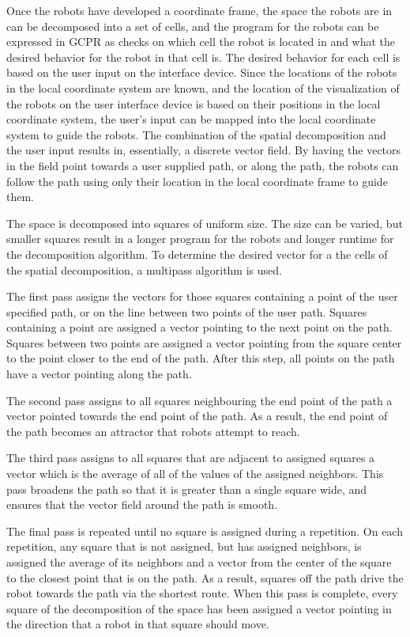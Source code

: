 Once the robots have developed a coordinate frame, the space the robots are in can be decomposed into a set of cells, and the program for the robots can be expressed in GCPR as checks on which cell the robot is located in and what the desired behavior for the robot in that cell is. 
The desired behavior for each cell is based on the user input on the interface device. Since the locations of the robots in the local coordinate system are known, and the location of the visualization of the robots on the user interface device is based on their positions in the local coordinate system, the user's input can be mapped into the local coordinate system to guide the robots. 
The combination of the spatial decomposition and the user input results in, essentially, a discrete vector field. 
By having the vectors in the field point towards a user supplied path, or along the path, the robots can follow the path using only their location in the local coordinate frame to guide them. 

The space is decomposed into squares of uniform size. The size can be varied, but smaller squares result in a longer program for the robots and longer runtime for the decomposition algorithm. 
To determine the desired vector for a the cells of the spatial decomposition, a multipass algorithm is used. 

The first pass assigns the vectors for those squares containing a point of the user specified path, or on the line between two points of the user path. 
Squares containing a point are assigned a vector pointing to the next point on the path. 
Squares between two points are assigned a vector pointing from the square center to the point closer to the end of the path. 
After this step, all points on the path have a vector pointing along the path. 

The second pass assigns to all squares neighbouring the end point of the path a vector pointed towards the end point of the path. 
As a result, the end point of the path becomes an attractor that robots attempt to reach. 

The third pass assigns to all squares that are adjacent to assigned squares a vector which is the average of all of the values of the assigned neighbors. 
This pass broadens the path so that it is greater than a single square wide, and ensures that the vector field around the path is smooth. 

The final pass is repeated until no square is assigned during a repetition. 
On each repetition, any square that is not assigned, but has assigned neighbors, is assigned the average of its neighbors and a vector from the center of the square to the closest point that is on the path. 
As a result, squares off the path drive the robot towards the path via the shortest route. 
When this pass is complete, every square of the decomposition of the space has been assigned a vector pointing in the direction that a robot in that square should move. 

